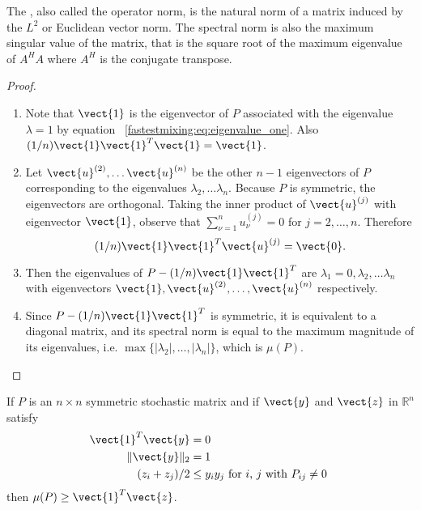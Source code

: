\documentclass[12pt]{article}
\begin{document}
\begin{remark}
    The %
    , also called the operator norm, is the natural norm of a matrix
    induced by the \( L^2 \) or Euclidean vector norm.  The spectral
    norm is also the maximum singular value of the matrix, that is the
    square root of the maximum eigenvalue of \( A^H A \) where \( A^H \)
    is the conjugate transpose.
\end{remark}

\begin{proof}
    \begin{enumerate}
        \item
            Note that \( \vect{1} \) is the eigenvector of \( P \)
            associated with the eigenvalue \( \lambda = 1 \) by
            equation~%
            \eqref{fastestmixing:eq:eigenvalue_one}.  Also \( (1/n)
            \vect{1}\vect{1}^T \vect{1} = \vect{1} \).
        \item
            Let \( \vect{u}^{(2)}, \dots \vect{u}^{(n)} \) be the other \(
            n-1 \) eigenvectors of \( P \) corresponding to the
            eigenvalues \( \lambda_2, \dots \lambda_n \).  Because \( P \)
            is symmetric, the eigenvectors are orthogonal.  Taking the
            inner product of \( \vect{u}^{(j)} \) with eigenvector \(
            \vect{1} \), observe that \( \sum_{\nu=1}^n u_\nu^{(j)} = 0 \)
            for \( j=2,\dots, n \).  Therefore
            \[
                (1/n) \vect{1}\vect{1}^T \vect{u}^{(j)} = \vect{0}.
            \]
        \item
            Then the eigenvalues of \( P - (1/n)\vect{1}\vect{1}^T \)
            are \( \lambda_1 = 0, \lambda_2, \dots \lambda_n \) with
            eigenvectors \( \vect{1}, \vect{u}^{(2)}, \dots, \vect{u}^{(n)}
            \) respectively.
        \item
            Since \( P - (1/n) \vect{1}\vect{1}^T \) is symmetric, it is
            equivalent to a diagonal matrix, and its spectral norm is
            equal to the maximum magnitude of its eigenvalues, i.e. \(
            \max\{ {|\lambda_2|, \dots, |\lambda_n|}\} \), which is \(
            \mu(P) \).
    \end{enumerate}
\end{proof}

\begin{lemma}
    \label{fastestmixing:lemma:two} If \( P \) is an \( n \times n \)
    symmetric stochastic matrix and if \( \vect{y} \) and \( \vect{z} \)
    in \( \mathbb{R}^n \) satisfy
    \begin{align}
        \vect{1}^T \vect{y} &= 0%
        \label{fastestmixing:eq:orthogonal}\\
        \| \vect{y} \|_2 &= 1%
        \label{fastestmixing:eq:normalize} \\
        (z_i + z_j)/2 &\le y_i y_j \text{ for \( i \), \( j \) with \( P_
        {ij} \ne 0 \) }%
        \label{fastestmixing:eq:inequality}
    \end{align}
    then \( \mu(P) \ge \vect{1}^T \vect{z} \).
\end{lemma}
\end{document}
